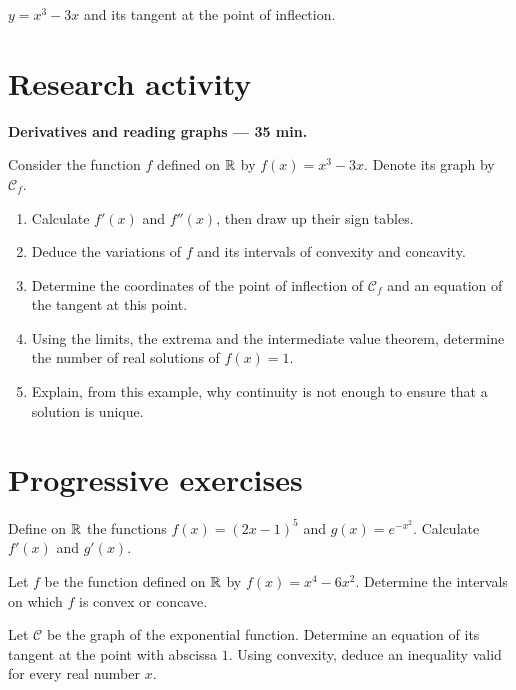 \begin{center}\par\small $y=x^3-3x$ and its tangent at the point of inflection.\end{center}

\section{Research activity}\textbf{Derivatives and reading graphs --- 35 min.}\par Consider the function $f$ defined on $\mathbb R$ by $f(x)=x^3-3x$. Denote its graph by $\mathcal C_f$.
\begin{enumerate}\item Calculate $f' (x)$ and $f'' (x)$, then draw up their sign tables.
\item Deduce the variations of $f$ and its intervals of convexity and concavity.
\item Determine the coordinates of the point of inflection of $\mathcal C_f$ and an equation of the tangent at this point.
\item Using the limits, the extrema and the intermediate value theorem, determine the number of real solutions of $f(x)=1$.
\item Explain, from this example, why continuity is not enough to ensure that a solution is unique.\end{enumerate}

\section{Progressive exercises}

Define on $\mathbb R$ the functions $f(x)=(2x-1)^5$ and $g(x)=e^{-x^2}$. Calculate $f' (x)$ and $g' (x)$.

Let $f$ be the function defined on $\mathbb R$ by $f(x)=x^4-6x^2$. Determine the intervals on which $f$ is convex or concave.

Let $\mathcal C$ be the graph of the exponential function. Determine an equation of its tangent at the point with abscissa $1$. Using convexity, deduce an inequality valid for every real number $x$.

